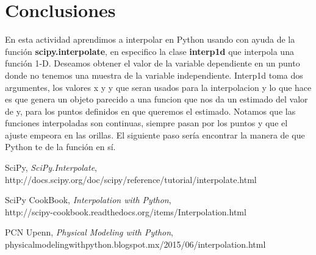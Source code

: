 \documentclass[12pt,spanish]{article}
\begin{document}
\newpage

\section*{Conclusiones}

En esta actividad aprendimos a interpolar en Python usando con ayuda de la función \textbf{scipy.interpolate}, en especifico la clase \textbf{interp1d} que interpola una función 1-D. Deseamos obtener el valor de la variable dependiente en un punto donde no tenemos una muestra de la variable independiente. Interp1d toma dos argumentes, los valores x y y que seran usados para la interpolacion y lo que hace es que genera un objeto parecido a una funcion que nos da un estimado del valor de y, para los puntos definidos en que queremos el estimado. Notamos que las funciones interpoladas son continuas, siempre pasan por los puntos y que el ajuste empeora en las orillas. El siguiente paso sería encontrar la manera de que Python te de la función en sí.

\begin{thebibliography}{9}

  SciPy,
  \emph{SciPy.Interpolate}, \\
  http://docs.scipy.org/doc/scipy/reference/tutorial/interpolate.html
  
  SciPy CookBook,
  \emph{Interpolation with Python}, \\
  http://scipy-cookbook.readthedocs.org/items/Interpolation.html
  
  PCN Upenn,
  \emph{Physical Modeling with Python}, \\
  physicalmodelingwithpython.blogspot.mx/2015/06/interpolation.html

\end{thebibliography}
\end{document}
